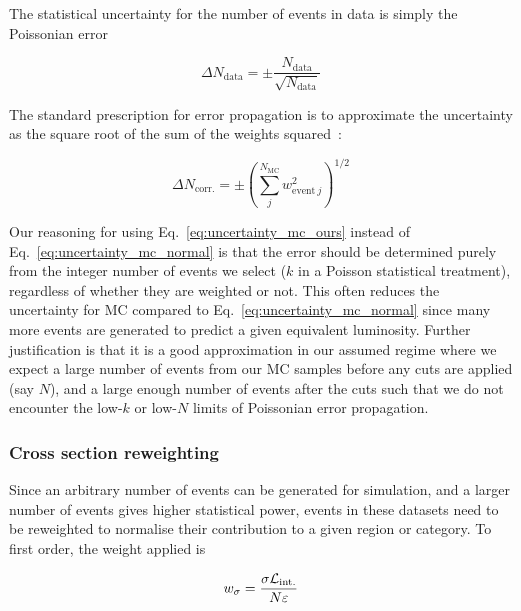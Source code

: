 The statistical uncertainty for the number of events in data is simply the Poissonian error

\begin{equation}
\Delta N_{\mathrm{data}} = \pm \frac{ N_{\mathrm{data}} }{ \sqrt{N_{\mathrm{data}}} }
\label{eq:uncertainty_data}
\end{equation}

The standard prescription for error propagation is to approximate the uncertainty as the square root of the sum of the weights squared~\cite{bevington2003data}:

\begin{equation}
\Delta N_{\mathrm{corr.}} = \pm \left( \sum_j^{N_{\mathrm{MC}}} w_{\mathrm{event} \ j}^2 \right) ^{1/2}
\label{eq:uncertainty_mc_normal}
\end{equation}

Our reasoning for using Eq.~\ref{eq:uncertainty_mc_ours} instead of Eq.~\ref{eq:uncertainty_mc_normal} is that the error should be determined purely from the integer number of events we select ($k$ in a Poisson statistical treatment), regardless of whether they are weighted or not. This often reduces the uncertainty for MC compared to Eq.~\ref{eq:uncertainty_mc_normal} since many more events are generated to predict a given equivalent luminosity. Further justification is that it is a good approximation in our assumed regime where we expect a large number of events from our MC samples before any cuts are applied (say $N$), and a large enough number of events after the cuts such that we do not encounter the low-$k$ or low-$N$ limits of Poissonian error propagation.




\subsubsection{Cross section reweighting}
\label{subsubsec:xs_weighting}

Since an arbitrary number of events can be generated for simulation, and a larger number of events gives higher statistical power, events in these datasets need to be reweighted to normalise their contribution to a given region or category. To first order, the weight applied is

\begin{equation}
w_{\sigma} = \frac{ \sigma \mathcal{L}_{\mathrm{int.}} }{ N \varepsilon }
\end{equation}

